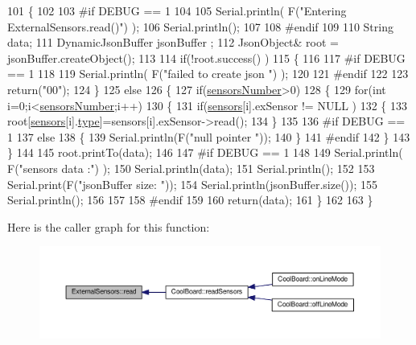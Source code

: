 \begin{DoxyCode}
101 \{
102 
103 \textcolor{preprocessor}{#if DEBUG == 1}
104 
105     Serial.println( F(\textcolor{stringliteral}{"Entering ExternalSensors.read()"}) );
106     Serial.println();
107 
108 \textcolor{preprocessor}{#endif }
109 
110     String data;
111     DynamicJsonBuffer  jsonBuffer ;
112     JsonObject& root = jsonBuffer.createObject();
113 
114     \textcolor{keywordflow}{if}(!root.success() )
115     \{
116  
117 \textcolor{preprocessor}{    #if DEBUG == 1}
118 
119         Serial.println( F(\textcolor{stringliteral}{"failed to create json "}) );
120     
121 \textcolor{preprocessor}{    #endif }
122 
123         \textcolor{keywordflow}{return}(\textcolor{stringliteral}{"00"});
124     \}
125     \textcolor{keywordflow}{else}
126     \{
127         \textcolor{keywordflow}{if}(\hyperlink{class_external_sensors_a58e4fbf9adeae787d92be5fa33043b5d}{sensorsNumber}>0)
128         \{
129             \textcolor{keywordflow}{for}(\textcolor{keywordtype}{int} i=0;i<\hyperlink{class_external_sensors_a58e4fbf9adeae787d92be5fa33043b5d}{sensorsNumber};i++)
130             \{
131                 \textcolor{keywordflow}{if}(\hyperlink{class_external_sensors_a284233f884fcf00154a44740cf1d9e1e}{sensors}[i].exSensor != NULL )
132                 \{
133                     root[\hyperlink{class_external_sensors_a284233f884fcf00154a44740cf1d9e1e}{sensors}[i].\hyperlink{struct_external_sensors_1_1sensor_a6acfdb02c742c2110d7bd2b5d9fce9e7}{type}]=sensors[i].exSensor->read();       
134                 \}
135             
136 \textcolor{preprocessor}{            #if DEBUG == 1}
137                 \textcolor{keywordflow}{else}
138                 \{
139                     Serial.println(F(\textcolor{stringliteral}{"null pointer "}));
140                 \}
141 \textcolor{preprocessor}{            #endif  }
142             \}
143         \}   
144         
145         root.printTo(data);
146     
147 \textcolor{preprocessor}{    #if DEBUG == 1}
148 
149         Serial.println( F(\textcolor{stringliteral}{"sensors data :"}) );
150         Serial.println(data);
151         Serial.println();
152 
153         Serial.print(F(\textcolor{stringliteral}{"jsonBuffer size: "}));
154         Serial.println(jsonBuffer.size());
155         Serial.println();
156 
157     
158 \textcolor{preprocessor}{    #endif}
159     
160         \textcolor{keywordflow}{return}(data);
161     \}
162 
163 \}
\end{DoxyCode}
Here is the caller graph for this function\+:\nopagebreak
\begin{figure}[H]
\begin{center}
\leavevmode
\includegraphics[width=350pt]{d1/d2f/class_external_sensors_a53177b81eca3be89508b5511ddcd00fc_icgraph}
\end{center}
\end{figure}


